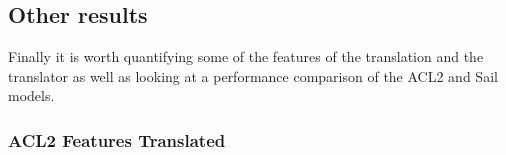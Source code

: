 \documentclass[a4paper,12pt,twoside,openright]{report}
\begin{document}



\subsection{Other results}

Finally it is worth quantifying some of the features of the translation and the translator as well as looking at a performance comparison of the ACL2 and Sail models.

\subsubsection{ACL2 Features Translated}
\end{document}
